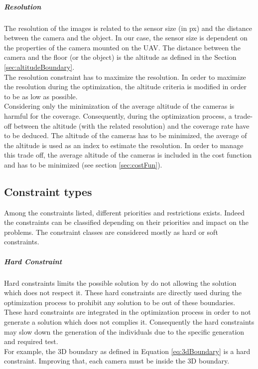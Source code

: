 \subparagraph{Resolution}
The resolution of the images is related to the sensor size (in px) and the distance between the camera and the object. In our case, the sensor size is dependent on the properties of the camera mounted on the UAV.%
 The distance between the camera and the floor (or the object) is the altitude as  defined in the Section \ref{sec:altitudeBoundary}. \\
 The resolution constraint has to maximize the resolution. In order to maximize the resolution during the optimization, the altitude criteria is modified in order to be as low as possible.\\
Considering only the minimization of the average altitude of the cameras is harmful for the coverage.
Consequently, during the optimization process, a trade-off between the altitude (with the related resolution) and the coverage rate have to be deduced.
 The altitude of the cameras  has to be  minimized, the average of the altitude is used as an index to estimate the resolution. %
 In order to manage this trade off, the average altitude of the cameras is included in the cost function  and has to be minimized (see section  \ref{sec:costFun}).  \\
 
\subsection{Constraint types} \label{sec:ConstraintTypesSoftHard}
 
Among the constraints listed, different priorities and restrictions exists. Indeed the constraints can be classified depending on their priorities and impact on the problems. The constraint classes are considered mostly as hard or soft constraints. %

\subparagraph{Hard Constraint}
 Hard constraints limits the possible solution by do not allowing the solution which does not respect it. These hard constraints are directly used during the optimization process to prohibit any solution to be out of these boundaries. These hard constraints are integrated in the optimization process in order to not generate a solution which does not complies it. Consequently the hard constraints may slow down the generation of the individuals due to the specific generation and required test.\\ 
 For example, the 3D boundary as defined in Equation \ref{eq:3dBoundary} is a hard constraint. Improving that, each camera must be inside the 3D boundary.\\ %
 
